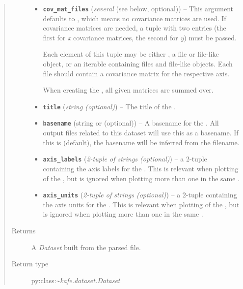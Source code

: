 \documentclass[a4paper,10pt,english]{sphinxmanual}
\begin{document}
\begin{fulllineitems}
\begin{quote}
\begin{description}
\begin{itemize}
\item {} 
\textbf{\texttt{cov\_mat\_files}} (\emph{several} (see below, optional)) -- 
This argument defaults to , which means no covariance matrices
are used. If covariance matrices are needed, a tuple with two entries
(the first for \emph{x} covariance matrices, the second for \emph{y}) must be
passed.

Each element of this tuple may be either , a file or file-like
object, or an iterable containing files and file-like objects. Each
file should contain a covariance matrix for the respective axis.

When creating the , all given matrices are summed over.


\item {} 
\textbf{\texttt{title}} (\emph{string (optional)}) -- The title of the .

\item {} 
\textbf{\texttt{basename}} (string or  (optional)) -- A basename for the . All output files related to this dataset
will use this as a basename. If this is  (default), the
basename will be inferred from the filename.

\item {} 
\textbf{\texttt{axis\_labels}} (\emph{2-tuple of strings (optional)}) -- a 2-tuple containing the axis labels for the . This is
relevant when plotting  of the , but is ignored when
plotting more than one  in the same .

\item {} 
\textbf{\texttt{axis\_units}} (\emph{2-tuple of strings (optional)}) -- a 2-tuple containing the axis units for the . This is
relevant when plotting  of the , but is ignored when
plotting more than one  in the same .

\end{itemize}

\item[{Returns}] \leavevmode
A \emph{Dataset} built from the parsed file.

\item[{Return type}] \leavevmode
py:class:\emph{\textasciitilde{}kafe.dataset.Dataset}

\end{description}\end{quote}

\end{fulllineitems}
\end{document}
